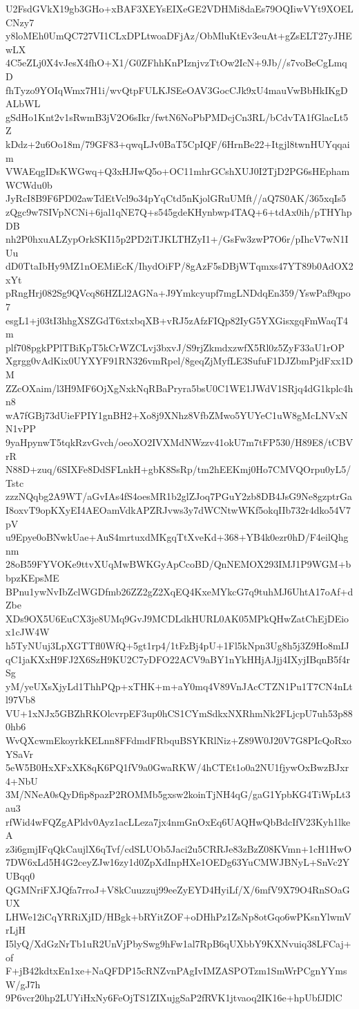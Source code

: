 U2FsdGVkX19gb3GHo+xBAF3XEYsEIXeGE2VDHMi8daEs79OQIiwVYt9XOELCNzy7
y8loMEh0UmQC727VI1CLxDPLtwoaDFjAz/ObMluKtEv3euAt+gZsELT27yJHEwLX
4C5eZLj0X4vJesX4fhO+X1/G0ZFhhKnPIznjvzTtOw2IcN+9Jb//s7voBeCgLmqD
fhTyzo9YOIqWmx7H1i/wvQtpFULKJSEeOAV3GocCJk9xU4mauVwBbHkIKgDALbWL
gSdHo1Knt2v1sRwmB3jV2O6sIkr/fwtN6NoPbPMDcjCn3RL/bCdvTA1fGlacLt5Z
kDdz+2u6Oo18m/79GF83+qwqLJv0BaT5CpIQF/6HrnBe22+Itgjl8twnHUYqqaim
VWAEqgIDsKWGwq+Q3xHJIwQ5o+OC11mhrGCshXUJ0I2TjD2PG6sHEphamWCWdu0b
JyRcI8B9F6PD02awTdEtVcl9o34pYqCtd5nKjolGRuUMft//aQ7S0AK/365xqIs5
zQgc9w7SIVpNCNi+6jal1qNE7Q+s545gdeKHynbwp4TAQ+6+tdAx0ih/pTHYhpDB
nh2P0hxuALZypOrkSKI15p2PD2iTJKLTHZyI1+/GsFw3zwP7O6r/pIhcV7wN1IUu
dD0TtaIbHy9MZ1nOEMiEcK/IhydOiFP/8gAzF5sDBjWTqmxs47YT89b0AdOX2xYt
pRngHrj082Sg9QVcq86HZLl2AGNa+J9Ymkcyupf7mgLNDdqEn359/YswPaf9qpo7
esgL1+j03tI3hhgXSZGdT6xtxbqXB+vRJ5zAfzFIQp82IyG5YXGisxgqFmWaqT4m
plf708pgkPPlTBiKpT5kCrWZCLvj3bxvJ/S9rjZkmdxzwfX5Rl0z5ZyF33aU1rOP
Xgrgg0vAdKix0UYXYF91RN326vmRpel/8geqZjMyfLE3SufuF1DJZbmPjdFxx1DM
ZZcOXaim/l3H9MF6OjXgNxkNqRBaPryra5bsU0C1WE1JWdV1SRjq4dG1kplc4hn8
wA7fGBj73dUieFPIY1gnBH2+Xo8j9XNhz8VfbZMwo5YUYeC1uW8gMcLNVxNN1vPP
9yaHpynwT5tqkRzvGvch/oeoXO2IVXMdNWzzv41okU7m7tFP530/H89E8/tCBVrR
N88D+zuq/6SIXFe8DdSFLnkH+gbK8SsRp/tm2hEEKmj0Ho7CMVQOrpu0yL5/Tstc
zzzNQqbg2A9WT/aGvIAs4fS4oesMR1b2glZJoq7PGuY2zb8DB4JsG9Ne8gzptrGa
I8oxvT9opKXyEI4AEOamVdkAPZRJvws3y7dWCNtwWKf5okqIIb732r4dko54V7pV
u9Epye0oBNwkUae+AuS4mrtuxdMKgqTtXveKd+368+YB4k0ezr0hD/F4eilQhgnm
28oB59FYVOKe9ttvXUqMwBWKGyApCcoBD/QnNEMOX293IMJ1P9WGM+bbpzKEpsME
BPnu1ywNvIbZclWGDfmb26ZZ2gZ2XqEQ4KxeMYkcG7q9tuhMJ6UhtA17oAf+dZbe
XDs9OX5U6EuCX3je8UMq9GvJ9MCDLdkHURL0AK05MPkQHwZatChEjDEiox1cJW4W
h5TyNUuj3LpXGTTfl0WfQ+5gt1rp4/1tFzBj4pU+1Fl5kNpn3Ug8h5j3Z9Ho8mIJ
qC1jaKXxH9FJ2X6SzH9KU2C7yDFO22ACV9aBY1nYkHHjAJjj4IXyjIBqnB5f4rSg
yM/yeUXsXjyLd1ThhPQp+xTHK+m+aY0mq4V89VnJAcCTZN1Pu1T7CN4nLtl97Vb8
VU+1xNJx5GBZhRKOlcvrpEF3up0hCS1CYmSdkxNXRhmNk2FLjcpU7uh53p880hb6
WvQXcwmEkoyrkKELnn8FFdmdFRbquBSYKRlNiz+Z89W0J20V7G8PIcQoRxoYSaVr
5eW5B0HxXFxXK8qK6PQ1fV9a0GwaRKW/4hCTEt1o0a2NU1fjywOxBwzBJxr4+NbU
3M/NNeA0sQyDfip8pazP2ROMMb5gxsw2koinTjNH4qG/gaG1YpbKG4TiWpLt3au3
rfWid4wFQZgAPldv0Ayz1acLLeza7jx4nmGnOxEq6UAQHwQbBdcIfV23Kyh1lkeA
z3i6gmjIFqQkCaujlX6qTvf/cdSLUOb5Jaci2u5CRRJe83zBzZ08KVmn+1cH1HwO
7DW6xLd5H4G2ceyZJw16zy1d0ZpXdInpHXe1OEDg63YuCMWJBNyL+SnVc2YUBqq0
QGMNriFXJQfa7rroJ+V8kCuuzzuj99eeZyEYD4HyiLf/X/6mfV9X79O4RnSOaGUX
LHWe12iCqYRRiXjID/HBgk+bRYitZOF+oDHhPz1ZsNp8otGqo6wPKsnYlwmVrLjH
I5lyQ/XdGzNrTb1uR2UnVjPbySwg9hFw1al7RpB6qUXbbY9KXNvuiq38LFCaj+of
F+jB42kdtxEn1xe+NaQFDP15cRNZvnPAgIvIMZASPOTzm1SmWrPCgnYYmsW/gJ7h
9P6vcr20hp2LUYiHxNy6FeOjTS1ZIXujgSaP2fRVK1jtvaoq2IK16e+hpUbfJDlC
